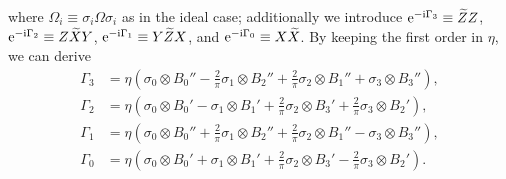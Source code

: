 \documentclass[pra,reprint,superscriptaddress]{revtex4-2}
\newcommand{\wt}[1]{\widetilde{#1}}
\begin{document}
where $\Omega_i \equiv \sigma_i \Omega \sigma_i$ as in the ideal case; additionally we introduce
$\upe^{-\upi  \Gamma_3}\equiv \wt Z Z$,
$\upe^{-\upi  \Gamma_2}\equiv Z \wt X Y$,
$\upe^{-\upi  \Gamma_1}\equiv Y \wt Z X$, and 
$\upe^{-\upi  \Gamma_0}\equiv X \wt X$.
By keeping the first order in 
$\eta$, we can derive
\begin{equation}\label{eq:PDDnp-Gamma}
 \begin{aligned}
 \Gamma_3 &= \eta(\sigma_0 \otimes B_0''- \frac{2}{\pi} \sigma_1 \otimes B_2'' 
  +\frac{2}{\pi}  \sigma_2 \otimes B_1'' + \sigma_3 \otimes B_3''),\\
\Gamma_2 &= \eta(\sigma_0 \otimes B_0'- \sigma_1 \otimes B_1'
  +\frac{2}{\pi}  \sigma_2 \otimes B_3' + \frac{2}{\pi} \sigma_3 \otimes B_2'),\\
  \Gamma_1 &= \eta(\sigma_0 \otimes B_0''+ \frac{2}{\pi} \sigma_1 \otimes B_2'' 
  +\frac{2}{\pi}  \sigma_2 \otimes B_1'' - \sigma_3 \otimes B_3''),\\
 \Gamma_0 &= \eta(\sigma_0 \otimes B_0'+ \sigma_1 \otimes B_1'
  +\frac{2}{\pi}  \sigma_2 \otimes B_3' - \frac{2}{\pi} \sigma_3 \otimes B_2').
 \end{aligned}
\end{equation}
\end{document}
